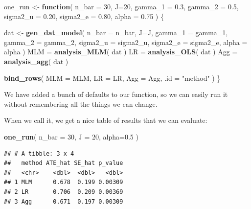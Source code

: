 \documentclass[
]{book}
\newenvironment{Shaded}{\begin{snugshade}}{\end{snugshade}}
\newcommand{\AttributeTok}[1]{\textcolor[rgb]{0.13,0.29,0.53}{#1}}
\newcommand{\ControlFlowTok}[1]{\textcolor[rgb]{0.13,0.29,0.53}{\textbf{#1}}}
\newcommand{\DecValTok}[1]{\textcolor[rgb]{0.00,0.00,0.81}{#1}}
\newcommand{\FloatTok}[1]{\textcolor[rgb]{0.00,0.00,0.81}{#1}}
\newcommand{\FunctionTok}[1]{\textcolor[rgb]{0.13,0.29,0.53}{\textbf{#1}}}
\newcommand{\NormalTok}[1]{#1}
\newcommand{\OtherTok}[1]{\textcolor[rgb]{0.56,0.35,0.01}{#1}}
\newcommand{\StringTok}[1]{\textcolor[rgb]{0.31,0.60,0.02}{#1}}
\begin{document}
\begin{Shaded}
\begin{Highlighting}[]
\NormalTok{one\_run }\OtherTok{\textless{}{-}} \ControlFlowTok{function}\NormalTok{( }\AttributeTok{n\_bar =} \DecValTok{30}\NormalTok{, }\AttributeTok{J=}\DecValTok{20}\NormalTok{, }
                     \AttributeTok{gamma\_1 =} \FloatTok{0.3}\NormalTok{, }\AttributeTok{gamma\_2 =} \FloatTok{0.5}\NormalTok{,}
                     \AttributeTok{sigma2\_u =} \FloatTok{0.20}\NormalTok{, }\AttributeTok{sigma2\_e =} \FloatTok{0.80}\NormalTok{,}
                     \AttributeTok{alpha =} \FloatTok{0.75}\NormalTok{ ) \{}
  
\NormalTok{  dat }\OtherTok{\textless{}{-}} \FunctionTok{gen\_dat\_model}\NormalTok{( }\AttributeTok{n\_bar =}\NormalTok{ n\_bar, }\AttributeTok{J=}\NormalTok{J, }
                        \AttributeTok{gamma\_1 =}\NormalTok{ gamma\_1, }\AttributeTok{gamma\_2 =}\NormalTok{ gamma\_2,}
                        \AttributeTok{sigma2\_u =}\NormalTok{ sigma2\_u, }\AttributeTok{sigma2\_e =}\NormalTok{ sigma2\_e,}
                        \AttributeTok{alpha =}\NormalTok{ alpha )}
\NormalTok{  MLM }\OtherTok{=} \FunctionTok{analysis\_MLM}\NormalTok{( dat )}
\NormalTok{  LR }\OtherTok{=} \FunctionTok{analysis\_OLS}\NormalTok{( dat )}
\NormalTok{  Agg }\OtherTok{=} \FunctionTok{analysis\_agg}\NormalTok{( dat )}
  
  \FunctionTok{bind\_rows}\NormalTok{( }\AttributeTok{MLM =}\NormalTok{ MLM, }\AttributeTok{LR =}\NormalTok{ LR, }\AttributeTok{Agg =}\NormalTok{ Agg,}
             \AttributeTok{.id =} \StringTok{"method"}\NormalTok{ )}
\NormalTok{\}}
\end{Highlighting}
\end{Shaded}

We have added a bunch of defaults to our function, so we can easily run it without remembering all the things we can change.

When we call it, we get a nice table of results that we can evaluate:

\begin{Shaded}
\begin{Highlighting}[]
\FunctionTok{one\_run}\NormalTok{( }\AttributeTok{n\_bar =} \DecValTok{30}\NormalTok{, }\AttributeTok{J =} \DecValTok{20}\NormalTok{, }\AttributeTok{alpha=}\FloatTok{0.5}\NormalTok{ )}
\end{Highlighting}
\end{Shaded}

\begin{verbatim}
## # A tibble: 3 x 4
##   method ATE_hat SE_hat p_value
##   <chr>    <dbl>  <dbl>   <dbl>
## 1 MLM      0.678  0.199 0.00309
## 2 LR       0.706  0.209 0.00369
## 3 Agg      0.671  0.197 0.00309
\end{verbatim}
\end{document}
